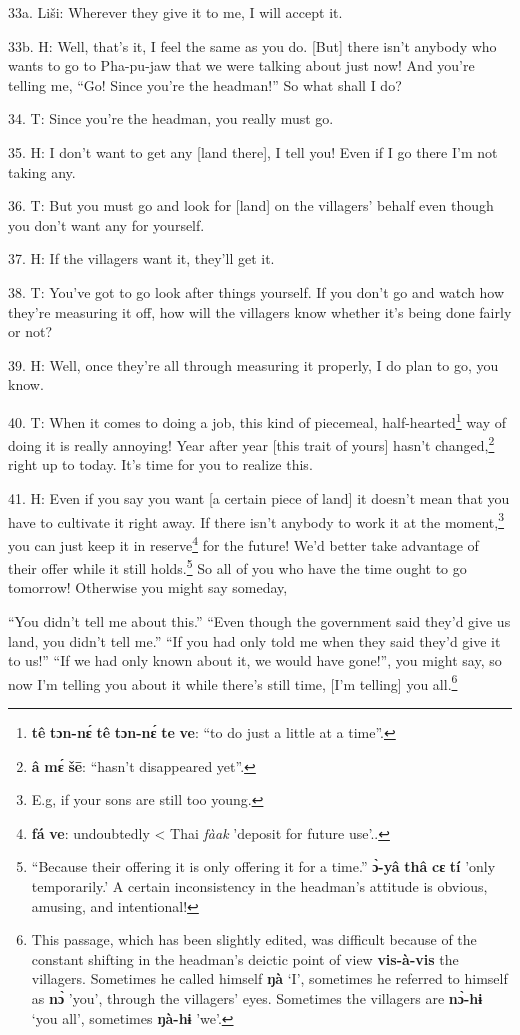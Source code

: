 33a. Liši: Wherever they give it to me, I will accept it.

33b. H: Well, that's it, I feel the same as you do. [But] there isn't anybody who
wants to go to Pha-pu-jaw that we were talking about just now! And you're telling
me, ``Go! Since you're the headman!'' So what shall I do?

34. T: Since you're the headman, you really must go.

35. H: I don't want to get any [land there], I tell you! Even if I go there I'm
not taking any.

36. T: But you must go and look for [land] on the villagers' behalf even though
you don't want any for yourself.

37. H: If the villagers want it, they'll get it.

38. T: You've got to go look after things yourself. If you don't go and watch
how they're measuring it off, how will the villagers know whether it's being done
fairly or not?

39. H: Well, once they're all through measuring it properly, I do plan to go, you
know.

40. T: When it comes to doing a job, this kind of piecemeal, half-hearted\footnote{\textbf{tê} \textbf{tɔn-nɛ́} \textbf{tê} \textbf{tɔn-nɛ́} \textbf{te} \textbf{ve}: ``to do just a little at a time''.}
way of doing it is really annoying! Year after year [this trait of yours] hasn't
changed,\footnote{\textbf{â} \textbf{mɛ́} \textbf{šē}: ``hasn't disappeared yet''.} right up to today. It's time for you to realize this.

41. H: Even if you say you want [a certain piece of land] it doesn't mean that you
have to cultivate it right away. If there isn't anybody to work it at the moment,\footnote{E.g, if your sons are still too young.}
you can just keep it in reserve\footnote{\textbf{fá} \textbf{ve}: undoubtedly < Thai \textit{fàak} 'deposit for future use'..} for the future! We'd better take advantage
of their offer while it still holds.\footnote{``Because their offering it is only offering it for a time.'' \textbf{ɔ̀-yâ} \textbf{thâ} \textbf{cɛ} \textbf{tí} 'only temporarily.' A certain inconsistency in the headman's attitude is obvious, amusing, and intentional!} So all of you who have the time ought
to go tomorrow! Otherwise you might say someday,

``You didn't tell me about this.'' ``Even though the government said they'd give
us land, you didn't tell me.'' ``If you had only told me when they said they'd
give it to us!'' ``If we had only known about it, we would have gone!'', you might
say, so now I'm telling you about it while there's still time, [I'm telling] you
all.\footnote{This passage, which has been slightly edited, was difficult because of the constant shifting in the headman's deictic point of view \textbf{vis-à-vis} the villagers. Sometimes he called himself \textbf{ŋà} `I', sometimes he referred to himself as \textbf{nɔ̀} 'you', through the villagers' eyes. Sometimes the villagers are \textbf{nɔ̀-hɨ} `you all', sometimes \textbf{ŋà-hɨ} 'we'.}

